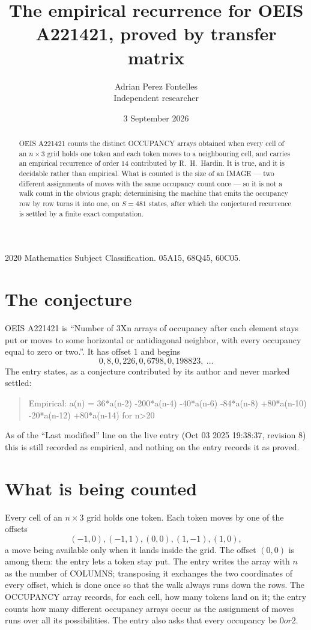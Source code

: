 \documentclass[11pt,a4paper]{article}
\title{The empirical recurrence for OEIS A221421, proved by transfer matrix}
\author{Adrian Perez Fontelles\\ \small Independent researcher}
\date{3 September 2026}
\theoremstyle{plain}
\theoremstyle{definition}
\begin{document}
\maketitle

\begin{abstract}
OEIS A221421 counts the distinct OCCUPANCY arrays obtained when every cell of an $n\times3$ grid
holds one token and each token moves to a neighbouring cell, and carries an empirical
recurrence of order $14$ contributed by R.~H.~Hardin. It is true, and it is decidable
rather than empirical. What is counted is the size of an IMAGE --- two different assignments of
moves with the same occupancy count once --- so it is not a walk count in the obvious graph;
determinising the machine that emits the occupancy row by row turns it into one, on $S=481$
states, after which the conjectured recurrence is settled by a finite exact computation.
\end{abstract}

\noindent\small 2020 Mathematics Subject Classification. 05A15, 68Q45, 60C05.\normalsize

\section{The conjecture}

OEIS A221421 is ``Number of 3Xn arrays of occupancy after each element stays put or moves to some horizontal or antidiagonal neighbor, with every occupancy equal to zero or two.''. It has offset $1$ and begins
\[
0, 8, 0, 226, 0, 6798, 0, 198823,\ \dots
\]
The entry states, as a conjecture contributed by its author and never marked settled:
\begin{quote}
Empirical: a(n) = 36*a(n-2) -200*a(n-4) -40*a(n-6) -84*a(n-8) +80*a(n-10) -20*a(n-12) +80*a(n-14) for n>20
\end{quote}
As of the ``Last modified'' line on the live entry (Oct 03 2025 19:38:37, revision 8) this is still
recorded as empirical, and nothing on the entry records it as proved.

\section{What is being counted}

Every cell of an $n\times3$ grid holds one token. Each token moves by one of the offsets
\[
(-1,0), (-1,1), (0,0), (1,-1), (1,0),
\]
a move being available only when it lands inside the grid. The offset $(0,0)$ is among them: the entry lets a token stay put. The entry writes the array with $n$ as the number of COLUMNS; transposing it exchanges the two coordinates of every offset, which is done once so that the walk always runs down the rows. The OCCUPANCY array
records, for each cell, how many tokens land on it; the entry counts how many different
occupancy arrays occur as the assignment of moves runs over all its possibilities. The entry also asks that every occupancy be $0 or 2$.
\end{document}
